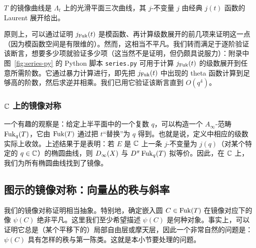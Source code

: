 \begin{theorem}\label{thm:7.2}
$T$ 的镜像曲线是 $\Lambda_t$ 上的光滑平面三次曲线，其 $j$-不变量 $j$ 由经典 $j(t)$ 函数的 Laurent 展开给出。
\end{theorem}


原则上，可以通过证明 $j_{\operatorname{Fuk}}(t)$ 是模函数、再计算级数展开的前几项来证明这一点（因为模函数空间是有限维的）。然而，这相当不平凡。我们转而满足于逐阶验证该断言，想要多少项就验证多少项（这当然不是证明，但仍颇具说服力）：附录中图~\ref{fig:series-py} 的 Python 脚本 \texttt{series.py} 可用于计算 $j_{\operatorname{Fuk}}(t)$ 的级数展开到任意所需阶数。它通过暴力计算进行，即先把 $j_{\operatorname{Fuk}}(t)$ 中出现的 theta 函数计算到足够高的阶数，然后求逆并相乘。我们已用它验证该断言直到 $O(q^4)$。

\subsubsection*{$\mathbb{C}$ 上的镜像对称}

一个有趣的观察是：给定上半平面中的一个复数 $q$，可以构造一个 $A_\infty$-范畴 $\operatorname{Fuk}_q(T)$，它由 $\operatorname{Fuk}(T)$ 通过把 $t$“替换”为 $q$ 得到。也就是说，定义中相应的级数实际上收敛。上述结果于是表明：若 $E$ 是 $\mathbb{C}$ 上一条 $j$-不变量为 $j(q)$（对某个特定的 $q\in\mathbb{C}$）的椭圆曲线，则 $D_\infty(X)$ 与 $D^\pi\operatorname{Fuk}_q(T)$ 拟等价。因此，在 $\mathbb{C}$ 上，我们为所有椭圆曲线找到了镜像。


\subsection{图示的镜像对称：向量丛的秩与斜率}
\label{subsec:rank-slope}

我们的镜像对称证明相当抽象。特别地，确定嵌入圆 $C\in\operatorname{Fuk}(T)$ 在镜像对应下的像 $\psi(C)$ 绝非平凡。这里我们至少希望描述 $\psi(C)$ 是何种对象。事实上，可以证明它总是（某个平移下的）局部自由层或摩天层，因此一个非常自然的问题是：$\psi(C)$ 具有怎样的秩与第一陈类。这就是本小节要处理的问题。

